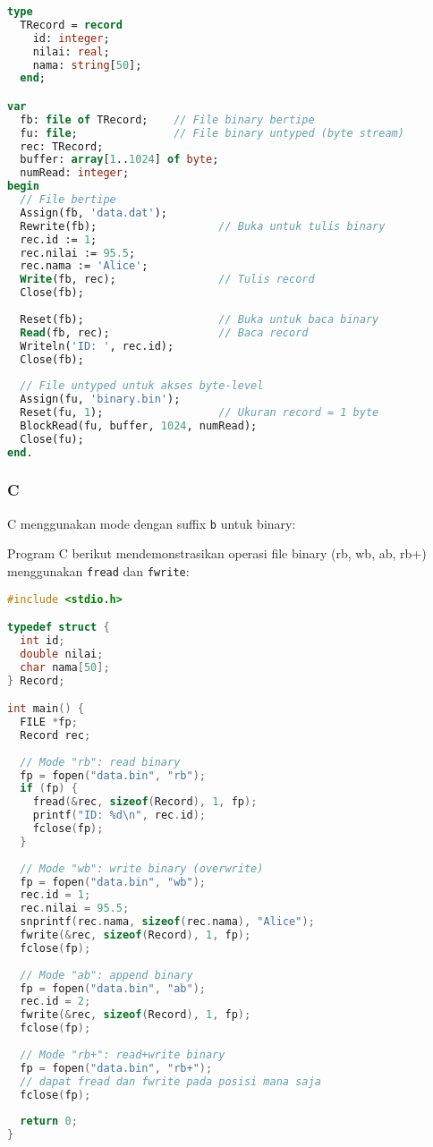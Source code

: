 \documentclass[../main.tex]{subfiles}
\begin{document}
\begin{lstlisting}[language=Pascal, caption={Deklarasi dan mode file binary Pascal}]
type
  TRecord = record
    id: integer;
    nilai: real;
    nama: string[50];
  end;

var
  fb: file of TRecord;    // File binary bertipe
  fu: file;               // File binary untyped (byte stream)
  rec: TRecord;
  buffer: array[1..1024] of byte;
  numRead: integer;
begin
  // File bertipe
  Assign(fb, 'data.dat');
  Rewrite(fb);                   // Buka untuk tulis binary
  rec.id := 1;
  rec.nilai := 95.5;
  rec.nama := 'Alice';
  Write(fb, rec);                // Tulis record
  Close(fb);
  
  Reset(fb);                     // Buka untuk baca binary
  Read(fb, rec);                 // Baca record
  Writeln('ID: ', rec.id);
  Close(fb);
  
  // File untyped untuk akses byte-level
  Assign(fu, 'binary.bin');
  Reset(fu, 1);                  // Ukuran record = 1 byte
  BlockRead(fu, buffer, 1024, numRead);
  Close(fu);
end.
\end{lstlisting}

\subsubsection{C}
C menggunakan mode dengan suffix \texttt{b} untuk binary:

Program C berikut mendemonstrasikan operasi file binary (rb, wb, ab, rb+) menggunakan \texttt{fread} dan \texttt{fwrite}:

\begin{lstlisting}[language=C, caption={Mode file binary di C}]
#include <stdio.h>

typedef struct {
  int id;
  double nilai;
  char nama[50];
} Record;

int main() {
  FILE *fp;
  Record rec;
  
  // Mode "rb": read binary
  fp = fopen("data.bin", "rb");
  if (fp) {
    fread(&rec, sizeof(Record), 1, fp);
    printf("ID: %d\n", rec.id);
    fclose(fp);
  }
  
  // Mode "wb": write binary (overwrite)
  fp = fopen("data.bin", "wb");
  rec.id = 1;
  rec.nilai = 95.5;
  snprintf(rec.nama, sizeof(rec.nama), "Alice");
  fwrite(&rec, sizeof(Record), 1, fp);
  fclose(fp);
  
  // Mode "ab": append binary
  fp = fopen("data.bin", "ab");
  rec.id = 2;
  fwrite(&rec, sizeof(Record), 1, fp);
  fclose(fp);
  
  // Mode "rb+": read+write binary
  fp = fopen("data.bin", "rb+");
  // dapat fread dan fwrite pada posisi mana saja
  fclose(fp);
  
  return 0;
}
\end{lstlisting}
\end{document}
